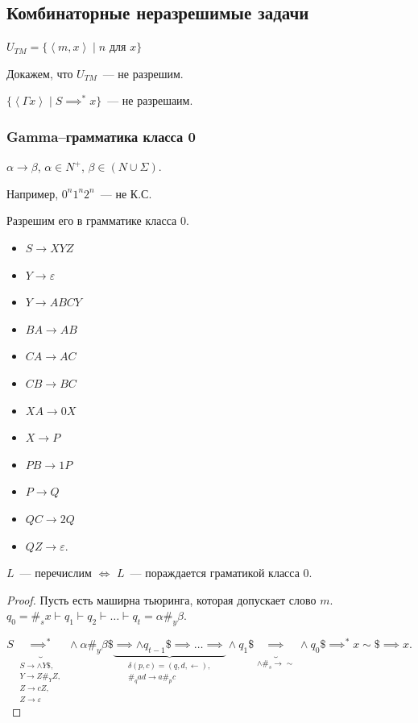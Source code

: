 \subsection{Комбинаторные неразрешимые задачи}

$U_{TM} = \{ \left< m, x \right> \mid n$ для $x \}$

Докажем, что $U_{TM}$~--- не разрешим.

\begin{theorem}
    $\{\left< \Gamma x \right> \mid S \implies^* x\}$~--- не разрешаим.
\end{theorem}

\subsubsection*{Gamma--грамматика класса 0}

$\alpha \to \beta$, $\alpha \in N^+ $, $\beta \in \left( N \cup \Sigma\right)$.

Например, $0^n 1^n 2^n$~--- не К.С.

Разрешим его в грамматике класса 0.

\begin{itemize}
    \item $S \to XYZ$
    \item $Y \to \varepsilon$
    \item $Y \to ABCY$
    \item $BA \to AB$
    \item $CA \to AC$
    \item $CB \to BC$
    \item $XA \to 0X$
    \item $X \to P$
    \item $PB \to 1P$
    \item $P \to Q$
    \item $QC \to 2Q$
    \item $QZ \to \varepsilon$.
\end{itemize}

\begin{theorem}
    $L$~--- перечислим $\iff$ $L$~--- пораждается граматикой класса 0.
\end{theorem}
\begin{proof}
    Пусть есть маширна тьюринга, которая допускает слово $m$.\\
    $q_0 = \#_s x \vdash q_1 \vdash q_2 \vdash \dots \vdash q_t = \alpha \#_y \beta$.

    \[ S \underbrace{\implies^{*}}_{\begin{array}{l}S \to \land Y \$, \\Y \to Z \#_Y Z,\\ Z \to cZ,\\ Z \to \varepsilon\end{array}}  \land \alpha \#_y \beta \$ \underbrace{\implies \land q_{t-1} \$ \implies \dots \implies}_{\begin{array}{l}\delta(p, c) = (q, d, \leftarrow),\\ \#_q  ad \to a \#_p c\end{array}} \land q_1 \$ \underbrace{ \implies}_{\land \#_s \to \sim} \land q_0 \$ \implies^{*} x \sim \$ \implies x . \]
\end{proof}

